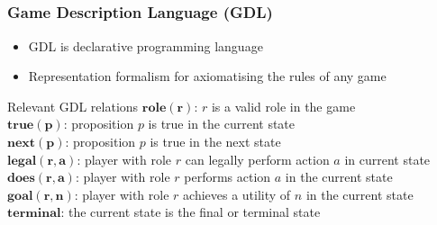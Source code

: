 \documentclass{beamer}
\begin{document}
\subsection{}
\begin{framefont}{\footnotesize}
  \begin{frame}
    \frametitle{Game Description Language (GDL)}
    \begin{itemize}[<+->]
      \item GDL is declarative programming language
      \item Representation formalism for axiomatising the rules of any game
    \end{itemize}
    \vspace{5pt}
    \pause
    \begin{block}{Relevant GDL relations}
      $\boldsymbol{role(r)}$: $r$ is a valid role in the game \\[5pt]
      $\boldsymbol{true(p)}$: proposition $p$ is true in the current state \\[5pt]
      $\boldsymbol{next(p)}$: proposition $p$ is true in the next state \\[5pt]
      $\boldsymbol{legal(r,a)}$: player with role $r$ can legally perform action $a$ in current state \\[5pt]
      $\boldsymbol{does(r,a)}$: player with role $r$ performs action $a$ in the current state \\[5pt]
      $\boldsymbol{goal(r,n)}$: player with role $r$ achieves a utility of $n$ in the current state \\[5pt]
      $\boldsymbol{terminal}$: the current state is the final or terminal state \\[5pt]
    \end{block}
  \end{frame}
\end{framefont}

\end{document}
